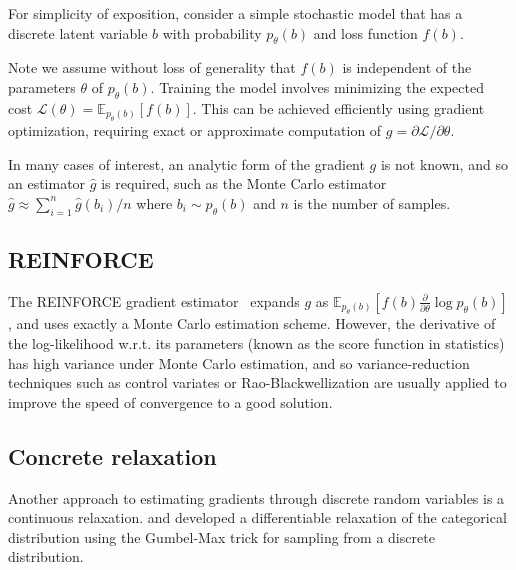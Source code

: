 \documentclass{article}
\newcommand{\discreteDist}{p_{\theta}(b)}
\newcommand{\loss}{f(b)}
\newcommand{\lossGrad}{\loss{} \frac{\partial}{\partial \theta }\log \discreteDist{}}
\newcommand{\mcGrad}{\hat{g}}
\newcommand{\expectedLoss}{\mathbb{E}_{\discreteDist{}}[\loss{}]}
\newcommand{\expectedLossLogTrick}{\mathbb{E}_{\discreteDist{}}[\lossGrad{}]}
\begin{document}
For simplicity of exposition, consider a simple stochastic model that has a discrete latent variable $b$ with probability $\discreteDist{}$ and loss function $\loss{}$.

Note we assume without loss of generality that $\loss{}$ is independent of the parameters  $\theta$ of $\discreteDist{}$.
Training the model involves minimizing the expected cost $\mathcal{L}(\theta)=\expectedLoss{}$.
This can be achieved efficiently using gradient optimization, requiring exact or approximate computation of $g=\partial\mathcal{L} / {\partial \theta}$.

In many cases of interest, an analytic form of the gradient $g$ is not known, and so an estimator $\mcGrad{}$ is required, such as the Monte Carlo estimator $\mcGrad{}\approx \sum_{i=1}^n\hat{g}(b_i) / n$ where $b_i\sim \discreteDist{}$ and $n$ is the number of samples. 

\subsection{REINFORCE}


The REINFORCE gradient estimator~\citep{williams1992simple} expands $g$ as $\expectedLossLogTrick{}$, and uses exactly a Monte Carlo estimation scheme. 
However, the derivative of the log-likelihood w.r.t. its parameters (known as the score function in statistics) has high variance under Monte Carlo estimation, and so variance-reduction techniques such as control variates or Rao-Blackwellization are usually applied to improve the speed of convergence to a good solution.

\subsection{Concrete relaxation}
Another approach to estimating gradients through discrete random variables is a continuous relaxation. 
\cite{maddison2016concrete} and \cite{jang2016categorical} developed a differentiable relaxation of the categorical distribution using the Gumbel-Max trick for sampling from a discrete distribution.

\end{document}
